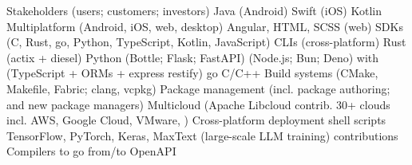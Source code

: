 \documentclass[11pt, a4paper]{article}
\begin{document}
\begin{minipage}[t]{0.56\textwidth}
\begin{tcbitemize}[raster columns=1, outerbox, 
    raster row skip=2pt]
    \tcbitem[colback=mybluei!40] 
        \begin{tcbitemize}[raster columns=6, raster rows=5, 
            raster equal height=all, 
            raster row skip=1pt, 
            raster column skip=1pt, 
            title style={left color=yellow!50!blue,right color=blue!50!green!50!black},
            innerbox]
            \tcbitem[raster multicolumn=6, colframe=blue!50!green!50!black, colback=blue!50!green!50!black, height=1cm] Stakeholders (users; customers; investors)
            \tcbitem Java (\mbox{Android})
            \tcbitem Swift (iOS)
            \tcbitem Kotlin Multiplatform (Android, iOS, web, desktop)
            \tcbitem Angular, HTML, SCSS (web)
            \tcbitem SDKs (C, Rust, go, Python, TypeScript, Kotlin, JavaScript)
            \tcbitem CLIs (cross-platform)
            \tcbitem[colback=myorange] Rust (actix + diesel)
            \tcbitem[colback=myorange] Python (Bottle; Flask; FastAPI)
            \tcbitem[raster multicolumn=2, colback=myorange] (Node.js; Bun; Deno) with (TypeScript + ORMs + express \textbar{} restify)
            \tcbitem[colback=myorange] go
            \tcbitem[colback=myorange] C/C++
            \tcbitem[colback=purple]Build systems (CMake, Makefile, Fabric; clang, vcpkg)
            \tcbitem[raster multicolumn=2, colback=purple] Package management (incl. package authoring; and new package managers)
            \tcbitem[raster multicolumn=2, colback=purple] Multicloud (Apache Libcloud contrib. 30+ clouds incl. AWS, Google Cloud, VMware, \textellipsis{})
            \tcbitem[colback=purple] Cross-platform deployment shell scripts
            \tcbitem[raster multicolumn=3,colback=darkpink] TensorFlow, PyTorch, Keras, MaxText (large-scale LLM training) contributions
            \tcbitem[raster multicolumn=3, colback=mygreen!140] Compilers to go from/to OpenAPI
        \end{tcbitemize}
\end{tcbitemize}

\end{minipage}
\end{document}

